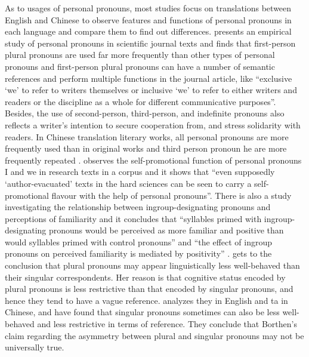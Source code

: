 \documentclass[degree=bachelor,language=english]{sysuthesis}
\begin{document}
As to usages of personal pronouns, most studies focus on translations between English and Chinese to observe features and functions of personal pronouns in each language and compare them to find out differences.
\citet{kuo1999use} presents an empirical study of personal pronouns in scientific journal texts and finds that first-person plural pronouns are used far more frequently than other types of personal pronouns and first-person plural pronouns can have a number of semantic references and perform multiple functions in the journal article, like “exclusive ‘we’ to refer to writers themselves or inclusive ‘we’ to refer to either writers and readers or the discipline as a whole for different communicative purposes”. Besides, the use of second-person, third-person, and indefinite pronouns also reflects a writer’s intention to secure cooperation from, and stress solidarity with readers. In Chinese translation literary works, all personal pronouns are more frequently used than in original works and third person pronoun he are more frequently repeated %
\citep{wang2010hanyu}.
\citet{harwood2005nowhere} observes the self-promotional function of personal pronouns I and we in research texts in a corpus and it shows that “even supposedly ‘author-evacuated’ texts in the hard sciences can be seen to carry a self-promotional flavour with the help of personal pronouns”. There is also a study investigating the relationship between ingroup-designating pronouns and perceptions of familiarity and it concludes that “syllables primed with ingroup-designating pronouns would be perceived as more familiar and positive than would syllables primed with control pronouns” and “the effect of ingroup pronouns on perceived familiarity is mediated by positivity” %
\citep{housley2010we}.
\citet{borthen2010we} gets to the conclusion that plural pronouns may appear linguistically less well-behaved than their singular correspondents. Her reason is that cognitive status encoded by plural pronouns is less restrictive than that encoded by singular pronouns, and hence they tend to have a vague reference.
\citet{chen2011less} analyzes they in English and ta in Chinese, and have found that singular pronouns sometimes can also be less well-behaved and less restrictive in terms of reference. They conclude that Borthen’s claim regarding the asymmetry between plural and singular pronouns may not be universally true.
\end{document}
